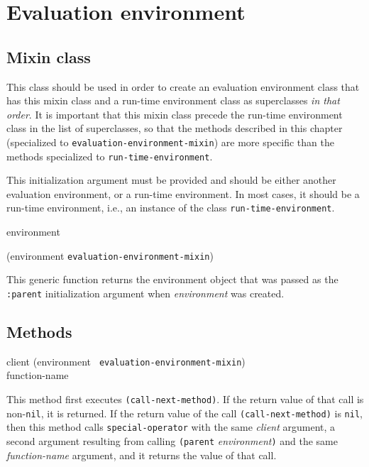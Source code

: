 \chapter{Evaluation environment}

\section{Mixin class}


This class should be used in order to create an evaluation environment
class that has this mixin class and a run-time environment class as
superclasses \emph{in that order}.  It is important that this mixin
class precede the run-time environment class in the list of
superclasses, so that the methods described in this chapter
(specialized to \texttt{evaluation-environment-mixin}) are more
specific than the methods specialized to
\texttt{run-time-environment}.


This initialization argument must be provided and should be either
another evaluation environment, or a run-time environment.  In most
cases, it should be a run-time environment, i.e., an instance of the
class \texttt{run-time-environment}.

 {environment}

 {(environment {\tt evaluation-environment-mixin})}

This generic function returns the environment object that was passed
as the \texttt{:parent} initialization argument when
\textit{environment} was created.

\section{Methods}

{\small{} {client (environment {\tt
      evaluation-environment-mixin}) \\ function-name}
}

This method first executes \texttt{(call-next-method)}.  If the return
value of that call is non-\texttt{nil}, it is returned.  If the return
value of the call \texttt{(call-next-method)} is \texttt{nil}, then
this method calls \texttt{special-operator} with the same
\textit{client} argument, a second argument resulting from calling
\texttt{(parent} \textit{environment}\texttt{)} and the same
\textit{function-name} argument, and it returns the value of that
call.

